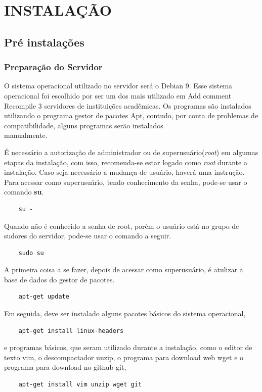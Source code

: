 \documentclass[12pt,hidelinks]{article}
\begin{document}
\section{INSTALAÇÃO}
\vspace{10.5cm}

    \subsection{Pré instalações}

        \subsubsection{Preparação do Servidor}
        
            \qquad O sistema operacional utilizado no servidor será o Debian 9. Esse sistema operacional foi escolhido por ser um dos mais utilizado em 
 Add comment
  Recompile
3
 servidores de instituições acadêmicas. Os programas são instalados utilizando o programa gestor de pacotes Apt, contudo, por conta de problemas de compatibilidade, alguns programas serão instalados \\manualmente.
            
            É necessário a autorização de administrador ou de superusuário(\textit{root}) em algumas etapas da instalação, com isso, recomenda-se estar logado como \textit{root} durante a instalação. Caso seja necessário a mudança de usuário, haverá uma instrução. Para acessar como superusuário, tendo conhecimento da senha, pode-se usar o comando \textbf{su}.
            \begin{verbatim}
    su -
            \end{verbatim}
            Quando não é conhecido a senha de root, porém o usuário está no grupo de sudores do servidor, pode-se usar o comando a seguir.
            \begin{verbatim}
    sudo su
            \end{verbatim}
            
            A primeira coisa a se fazer, depois de acessar como superusuário, é atulizar a base de dados do gestor de pacotes.

            \begin{verbatim}
    apt-get update
            \end{verbatim}
\newpage
            Em seguida, deve ser instalado alguns pacotes básicos do sistema operacional,
            \begin{verbatim}
    apt-get install linux-headers
            \end{verbatim}
            e programas básicos, que seram utilizado durante a instalação, como o editor de texto vim, o descompactador unzip, o programa para download web wget e o programa para download no github git,
            \begin{verbatim}
    apt-get install vim unzip wget git
            \end{verbatim}
            
\end{document}
